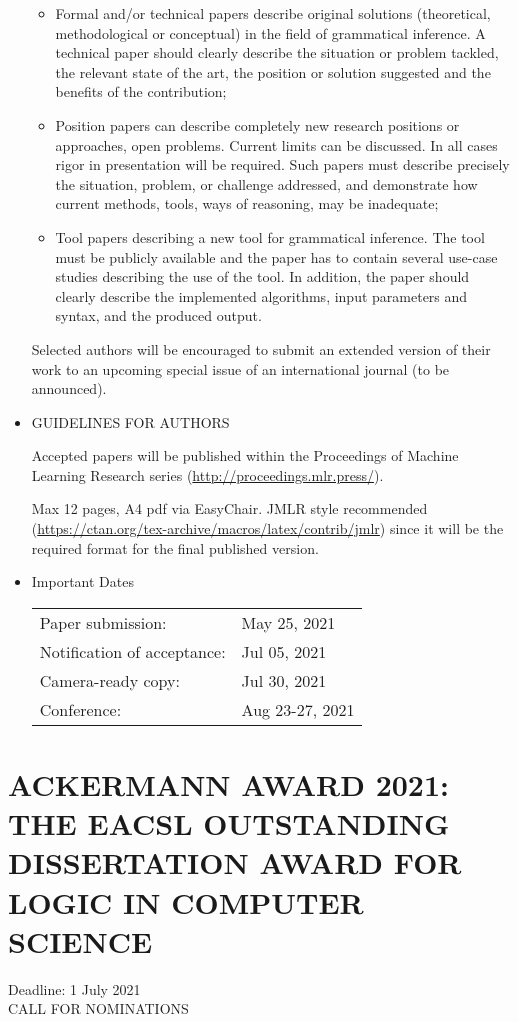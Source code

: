 \documentclass{article}
\begin{document}
\begin{itemize}
\begin{itemize}\item  Formal and/or technical papers describe original solutions (theoretical, methodological or conceptual) in the field of grammatical inference. A technical paper should clearly describe the situation or problem tackled, the relevant state of the art, the position or solution suggested and the benefits of the contribution;
\item  Position papers can describe completely new research positions or approaches, open problems. Current limits can be discussed. In all cases rigor in presentation will be required. Such papers must describe precisely the situation, problem, or challenge addressed, and demonstrate how current methods, tools, ways of reasoning, may be inadequate;
\item  Tool papers describing a new tool for grammatical inference. The tool must be publicly available and the paper has to contain several use-case studies describing the use of the tool. In addition, the paper should clearly describe the implemented algorithms, input parameters and syntax, and the produced output.
\end{itemize} 
   Selected authors will be encouraged to submit an extended version of their work to an upcoming  special issue of an international journal (to be announced). 
 
\item  GUIDELINES FOR AUTHORS 
 
  Accepted papers will be published within the Proceedings of Machine Learning Research series (\href{http://proceedings.mlr.press/}{http://proceedings.mlr.press/}).  
 
  Max 12 pages, A4 pdf via EasyChair. JMLR style recommended (\href{https://ctan.org/tex-archive/macros/latex/contrib/jmlr}{https://ctan.org/tex-archive/macros/latex/contrib/jmlr}) since it will be the required format for the final published version. 
 
\item  Important Dates 
 
\begin{tabulary}{\linewidth}{LL}Paper submission:  & May 25, 2021 \\
Notification of acceptance:  & Jul 05, 2021 \\
Camera-ready copy:  & Jul 30, 2021 \\
Conference:  & Aug 23-27, 2021 \\
\end{tabulary}
 
\end{itemize}\section{ACKERMANN AWARD 2021: THE EACSL OUTSTANDING DISSERTATION AWARD FOR LOGIC IN COMPUTER SCIENCE}\label{ACKERMANNAWARD2021}  Deadline: 1 July 2021\\ 
CALL FOR NOMINATIONS 
\end{document}
